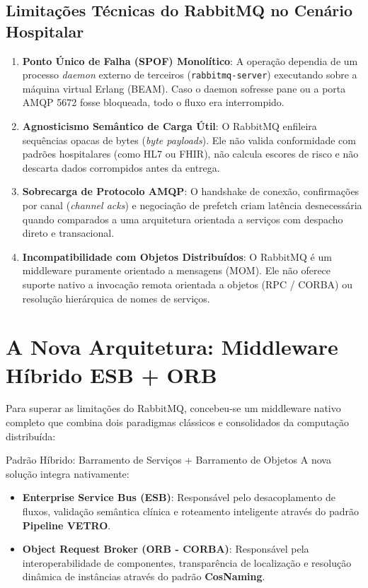 \documentclass[11pt,a4paper]{article}
\begin{document}
\subsection{Limitações Técnicas do RabbitMQ no Cenário Hospitalar}
\begin{enumerate}
    \item \textbf{Ponto Único de Falha (SPOF) Monolítico}: A operação dependia de um processo \textit{daemon} externo de terceiros (\texttt{rabbitmq-server}) executando sobre a máquina virtual Erlang (BEAM). Caso o daemon sofresse pane ou a porta AMQP 5672 fosse bloqueada, todo o fluxo era interrompido.
    \item \textbf{Agnosticismo Semântico de Carga Útil}: O RabbitMQ enfileira sequências opacas de bytes (\textit{byte payloads}). Ele não valida conformidade com padrões hospitalares (como HL7 ou FHIR), não calcula escores de risco e não descarta dados corrompidos antes da entrega.
    \item \textbf{Sobrecarga de Protocolo AMQP}: O handshake de conexão, confirmações por canal (\textit{channel acks}) e negociação de prefetch criam latência desnecessária quando comparados a uma arquitetura orientada a serviços com despacho direto e transacional.
    \item \textbf{Incompatibilidade com Objetos Distribuídos}: O RabbitMQ é um middleware puramente orientado a mensagens (MOM). Ele não oferece suporte nativo a invocação remota orientada a objetos (RPC / CORBA) ou resolução hierárquica de nomes de serviços.
\end{enumerate}

\section{A Nova Arquitetura: Middleware Híbrido ESB + ORB}

Para superar as limitações do RabbitMQ, concebeu-se um middleware nativo completo que combina dois paradigmas clássicos e consolidados da computação distribuída:

\begin{destaque}{Padrão Híbrido: Barramento de Serviços + Barramento de Objetos}
A nova solução integra nativamente:
\begin{itemize}
    \item \textbf{Enterprise Service Bus (ESB)}: Responsável pelo desacoplamento de fluxos, validação semântica clínica e roteamento inteligente através do padrão \textbf{Pipeline VETRO}.
    \item \textbf{Object Request Broker (ORB - CORBA)}: Responsável pela interoperabilidade de componentes, transparência de localização e resolução dinâmica de instâncias através do padrão \textbf{CosNaming}.
\end{itemize}
\end{destaque}
\end{document}
